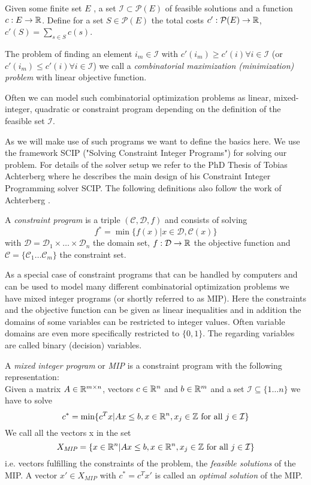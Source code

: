 \begin{definition}
 Given some finite set $E$ , a set $\mathcal{I}\subset \mathcal{P}(E)$ of feasible solutions and a function 
 $c:E\to \mathbb{R}$. Define for a set $S \in \mathcal{P}(E)$ the total costs $c':\mathcal{P}(E)\to \mathbb{R}$, 
 $c'(S)=\sum_{s\in S}c(s)$. 
 
 The problem of finding an element $i_m\in\mathcal{I}$ with $c'(i_m)\ge c'(i)\forall 
 i\in\mathcal{I} $ (or $c'(i_m)\le c'(i)\forall i\in\mathcal{I} $) we call a \textit{combinatorial maximization 
(minimization)  problem} with linear objective function.
\end{definition}

Often we can model such combinatorial optimization problems as linear, mixed-integer, quadratic or constraint program 
depending on the definition of the feasible set $\mathcal{I}$. 

As we will make use of such programs we want to define the basics here. We use the framework SCIP ("Solving Constraint 
Integer Programs") for solving our problem. For details of the solver setup we refer to the PhD Thesis of Tobias 
Achterberg \cite{Achterberg2007} where he describes the main design of his Constraint Integer Programming solver SCIP. 
The following definitions also follow the work of Achterberg \cite{Achterberg2007}.

\begin{definition}
 A \textit{constraint program} is a triple $(\mathcal{C},\mathcal{D},f)$ and consists of solving
 $$f^*=\min\{f(x)|x\in \mathcal{D}, \mathcal{C}(x)\}$$ 
 with $\mathcal{D}=\mathcal{D}_1\times \dots\times \mathcal{D}_n$ the domain set, $f:\mathcal{D}\to\mathbb{R}$ the objective 
function and $\mathcal{C}=\{\mathcal{C}_1\dots \mathcal{C}_m\}$ the constraint set.
\end{definition}

As a special case of constraint programs that can be handled by computers and can be used to model many different 
combinatorial optimization problems we have mixed integer programs (or shortly referred to as MIP). Here the 
constraints and the objective function can be given as linear inequalities and in addition the domains of some 
variables can be restricted to integer values. Often variable domains are even more specifically restricted to 
$\{0,1\}$. The regarding variables are called binary (decision) variables.

\begin{definition}
 A \textit{mixed integer program} or \textit{MIP} is a constraint program with the following representation:\\
 Given a matrix $A\in\mathbb{R}^{m\times n}$, vectors $c\in\mathbb{R}^n$ and $b\in \mathbb{R}^m$ and a set $\mathcal{I}\subseteq \{1\dots n\}$ 
 we have to solve
 $$c^*=\min\{c^T x|Ax\le b, x\in\mathbb{R}^n, x_j\in\mathbb{Z}\textrm{ for all }j\in\mathcal{I} \}$$
 We call all the vectors x in the set
 $$X_\textit{MIP}=\{x\in\mathbb{R}^n|A x\le b, x\in\mathbb{R}^n, x_j\in\mathbb{Z}\textrm{ for all }j\in\mathcal{I} \}$$
 i.e. vectors fulfilling the constraints of the problem, the \textit{feasible solutions} of the MIP. A vector $x'\in 
 X_\textit{MIP}$ with $c^*=c^Tx'$ is called an \textit{optimal solution} of the MIP.
\end{definition}

